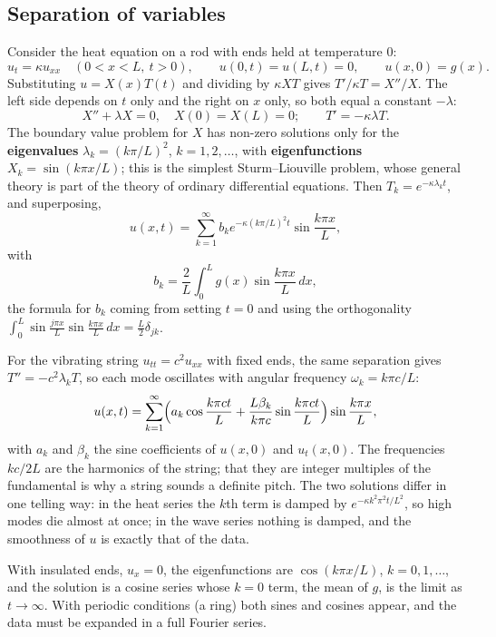 \documentclass[11pt,a4paper]{article}
\numberwithin{equation}{section}
\theoremstyle{definition}
\begin{document}
\subsection{Separation of variables}
\label{ssec:separation}

Consider the heat equation on a rod with ends held at temperature $0$:
\[
u_t = \kappa u_{xx} \quad (0 < x < L,\ t > 0), \qquad u(0, t) = u(L, t) = 0, \qquad u(x, 0) = g(x) .
\]
Substituting $u = X(x)T(t)$ and dividing by $\kappa XT$ gives $T'/\kappa T = X''/X$. The left side depends on $t$ only and the right on $x$ only, so both equal a constant $-\lambda$:
\[
X'' + \lambda X = 0, \quad X(0) = X(L) = 0; \qquad T' = -\kappa\lambda T .
\]
The boundary value problem for $X$ has non-zero solutions only for the \textbf{eigenvalues} $\lambda_k = (k\pi/L)^2$, $k = 1, 2, \ldots$, with \textbf{eigenfunctions} $X_k = \sin(k\pi x/L)$; this is the simplest Sturm--Liouville problem, whose general theory is part of the theory of ordinary differential equations. Then $T_k = e^{-\kappa\lambda_kt}$, and superposing,
\begin{equation}
\label{eq:heatseries}
u(x, t) = \sum_{k = 1}^\infty b_ke^{-\kappa(k\pi/L)^2t}\sin\frac{k\pi x}{L} ,
\end{equation}
with
\[
b_k = \frac2L\int_0^Lg(x)\sin\frac{k\pi x}{L}\,dx ,
\]
the formula for $b_k$ coming from setting $t = 0$ and using the orthogonality $\int_0^L\sin\frac{j\pi x}{L}\sin\frac{k\pi x}{L}\,dx = \frac L2\delta_{jk}$.

For the vibrating string $u_{tt} = c^2u_{xx}$ with fixed ends, the same separation gives $T'' = -c^2\lambda_kT$, so each mode oscillates with angular frequency $\omega_k = k\pi c/L$:
\[
u(x, t) = \sum_{k = 1}^\infty\Bigl(a_k\cos\frac{k\pi ct}{L} + \frac{L\beta_k}{k\pi c}\sin\frac{k\pi ct}{L}\Bigr)\sin\frac{k\pi x}{L} ,
\]
with $a_k$ and $\beta_k$ the sine coefficients of $u(x, 0)$ and $u_t(x, 0)$. The frequencies $kc/2L$ are the harmonics of the string; that they are integer multiples of the fundamental is why a string sounds a definite pitch. The two solutions differ in one telling way: in the heat series the
$k$th term is damped by $e^{-\kappa k^2\pi^2t/L^2}$, so high modes die almost at once; in the wave series nothing is damped, and the smoothness of $u$ is exactly that of the data.

With insulated ends, $u_x = 0$, the eigenfunctions are $\cos(k\pi x/L)$, $k = 0, 1, \ldots$, and the solution is a cosine series whose $k = 0$ term, the mean of $g$, is the limit as $t \to \infty$. With periodic conditions (a ring) both sines and cosines appear, and the data must be expanded in a full Fourier series.
\end{document}
